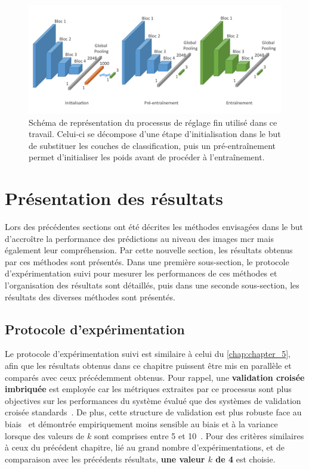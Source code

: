 \begin{figure}[H]
    \centering
    \includegraphics[width=\linewidth]{contents/chapter_6/resources/scheme_image_improvement_image_fine_tune.pdf}
    \caption{Schéma de représentation du processus de réglage fin utilisé dans ce travail. Celui-ci se décompose d'une étape d'initialisation dans le but de substituer les couches de classification, puis un pré-entraînement permet d'initialiser les poids avant de procéder à l'entraînement.}
    \label{fig:scheme_image_fine_tune}
\end{figure}\par
\clearpage

\section{Présentation des résultats}
Lors des précédentes sections ont été décrites les méthodes envisagées dans le but d'accroître la performance des prédictions au niveau des images \gls{mcr} mais également leur compréhension. Par cette nouvelle section, les résultats obtenus par ces méthodes sont présentés. Dans une première sous-section, le protocole d'expérimentation suivi pour mesurer les performances de ces méthodes et l'organisation des résultats sont détaillés, puis dans une seconde sous-section, les résultats des diverses méthodes sont présentés.\par

\subsection{Protocole d'expérimentation}
Le protocole d'expérimentation suivi est similaire à celui du \cref{chap:chapter_5}, afin que les résultats obtenus dans ce chapitre puissent être mis en parallèle et comparés avec ceux précédemment obtenus. Pour rappel, une \textbf{validation croisée imbriquée} est employée car les métriques extraites par ce processus sont plus objectives sur les performances du système évalué que des systèmes de validation croisée standards~\cite{Cawley2010}. De plus, cette structure de validation est plus robuste face au biais~\cite{Cawley2010} et démontrée empiriquement moins sensible au biais et à la variance lorsque des valeurs de $k$ sont comprises entre 5 et 10~\cite{James2000}. Pour des critères similaires à ceux du précédent chapitre, lié au grand nombre d'expérimentations, et de comparaison avec les précédents résultats, \textbf{une valeur $k$ de 4} est choisie.\par

